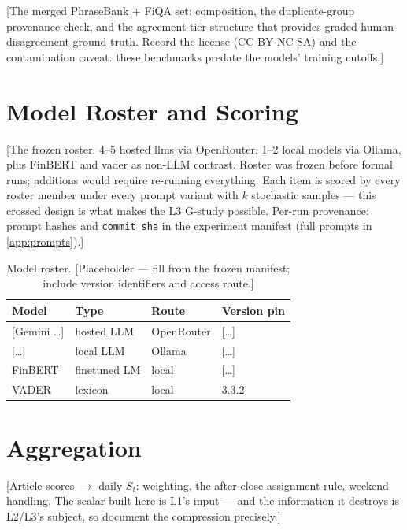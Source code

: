 [The merged PhraseBank + FiQA set: composition, the duplicate-group
provenance check, and the agreement-tier structure
\parencite{malo2014phrasebank} that provides graded human-disagreement
ground truth. Record the license (CC BY-NC-SA) and the contamination
caveat: these benchmarks predate the models' training cutoffs.]

\section{Model Roster and Scoring}
\label{sec:data-roster}

[The frozen roster: 4--5 hosted \glspl{llm} via OpenRouter, 1--2 local
models via Ollama, plus FinBERT \parencite{araci2019finbert} and
\gls{vader} \parencite{hutto2014vader} as non-LLM contrast. Roster was
frozen before formal runs; additions would require re-running
everything. Each item is scored by every roster member under every
prompt variant with $k$ stochastic samples --- this crossed design is
what makes the L3 G-study possible. Per-run provenance: prompt hashes
and \texttt{commit\_sha} in the experiment manifest (full prompts in
\cref{app:prompts}).]

\begin{table}[htbp]
  \centering
  \caption{Model roster. [Placeholder --- fill from the frozen
  manifest; include version identifiers and access route.]}
  \label{tab:roster}
  \begin{tabular}{@{}llll@{}}
    \toprule
    Model & Type & Route & Version pin \\
    \midrule
    {[Gemini \dots]}   & hosted LLM & OpenRouter & [\dots] \\
    {[\dots]}          & local LLM  & Ollama     & [\dots] \\
    FinBERT            & finetuned LM & local     & [\dots] \\
    VADER              & lexicon    & local      & 3.3.2 \\
    \bottomrule
  \end{tabular}
\end{table}

\section{Aggregation}
\label{sec:data-aggregation}

[Article scores $\to$ daily $S_t$: weighting, the after-close
assignment rule, weekend handling. The scalar built here is L1's input
--- and the information it destroys is L2/L3's subject, so document
the compression precisely.]

